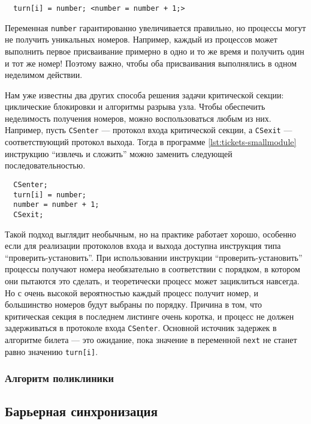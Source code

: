 \lstset{caption=}
\begin{lstlisting}
  turn[i] = number; <number = number + 1;>
\end{lstlisting}

Переменная \texttt{number} гарантированно увеличивается правильно, но процессы
могут не получить уникальных номеров. Например, каждый из процессов может
выполнить первое присваивание примерно в одно и то же время и получить один и
тот же номер! Поэтому важно, чтобы оба присваивания выполнялись в одном
неделимом действии.

Нам уже известны два других способа решения задачи критической секции:
циклические блокировки и алгоритмы разрыва узла. Чтобы обеспечить неделимость
получения номеров, можно воспользоваться любым из них. Например, пусть
\texttt{CSenter} --- протокол входа критической секции, а \texttt{CSexit} ---
соответствующий протокол выхода. Тогда в программе \ref{lst:tickets-smallmodule}
инструкцию ``извлечь и сложить'' можно заменить следующей последовательностью.

\lstset{caption=}
\begin{lstlisting}
  CSenter;
  turn[i] = number;
  number = number + 1;
  CSexit;
\end{lstlisting}

Такой подход выглядит необычным, но на практике работает хорошо, особенно если
для реализации протоколов входа и выхода доступна инструкция типа
``проверить-установить''. При использовании инструкции ``проверить-установить''
процессы получают номера необязательно в соответствии с порядком, в котором они
пытаются это сделать, и теоретически процесс может зациклиться навсегда. Но с
очень высокой вероятностью каждый процесс получит номер, и большинство номеров
будут выбраны по порядку. Причина в том, что критическая секция в последнем
листинге очень коротка, и процесс не должен задерживаться в протоколе входа
\texttt{CSenter}. Основной источник задержек в алгоритме билета --- это
ожидание, пока значение в переменной \texttt{next} не станет равно значению
\texttt{turn[i]}.


\subsubsection{Алгоритм поликлиники}



\subsection{Барьерная синхронизация}

